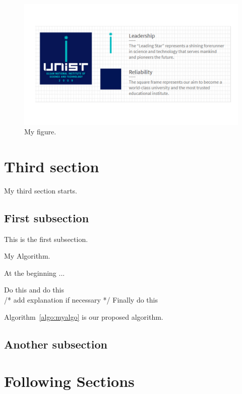 \documentclass[11pt,a4paper,onecolumn,oneside]{report}
\begin{document}
        \begin{figure}[h]
        \centering
        \includegraphics[width=12 cm]{Figures/myfigure.pdf}
        \caption{My figure.} \label{fig:myfigure}
        \end{figure}
    \newpage

    \section{Third section}
    My third section starts.

        \subsection{First subsection}
            This is the first subsection.


            \begin{algorithm}
            	\caption{My Algorithm.} \label{algo:myalgo}
                At the beginning ...

            	\begin{algorithmic}[1]
            	    \STATE Do this
                    \STATE and do this\\
                    /* add explanation if necessary */
                    \STATE Finally do this
            	\end{algorithmic}
            \end{algorithm}

            Algorithm~\ref{algo:myalgo} is our proposed algorithm.

        \subsection{Another subsection}
    \newpage

    \section{Following Sections}
    \newpage
\end{document}

